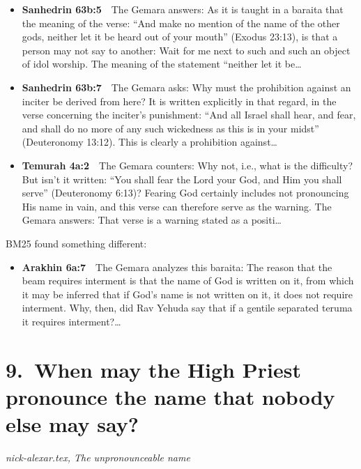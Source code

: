 \documentclass[11pt,a4paper]{article}
\begin{document}
\begin{itemize}[leftmargin=1.2em,itemsep=3pt]
\item {\color{ref}\textbf{Sanhedrin 63b:5}}\ \ The Gemara answers: As it is taught in a baraita that the meaning of the verse: “And make no mention of the name of the other gods, neither let it be heard out of your mouth” (Exodus 23:13), is that a person may not say to another: Wait for me next to such and such an object of idol worship. The meaning of the statement “neither let it be\ldots
\item {\color{ref}\textbf{Sanhedrin 63b:7}}\ \ The Gemara asks: Why must the prohibition against an inciter be derived from here? It is written explicitly in that regard, in the verse concerning the inciter’s punishment: “And all Israel shall hear, and fear, and shall do no more of any such wickedness as this is in your midst” (Deuteronomy 13:12). This is clearly a prohibition against\ldots
\item {\color{ref}\textbf{Temurah 4a:2}}\ \ The Gemara counters: Why not, i.e., what is the difficulty? But isn’t it written: “You shall fear the Lord your God, and Him you shall serve” (Deuteronomy 6:13)? Fearing God certainly includes not pronouncing His name in vain, and this verse can therefore serve as the warning. The Gemara answers: That verse is a warning stated as a positi\ldots
\end{itemize}
{\color{quiet}\small BM25 found something different:}
\begin{itemize}[leftmargin=1.2em]
\item {\color{ref}\textbf{Arakhin 6a:7}}\ \ The Gemara analyzes this baraita: The reason that the beam requires interment is that the name of God is written on it, from which it may be inferred that if God’s name is not written on it, it does not require interment. Why, then, did Rav Yehuda say that if a gentile separated teruma it requires interment?\ldots
\end{itemize}

\section*{9.\ When may the High Priest pronounce the name that nobody else may say?}
{\color{quiet}\small\textit{nick-alexar.tex, The unpronounceable name}}
\end{document}
